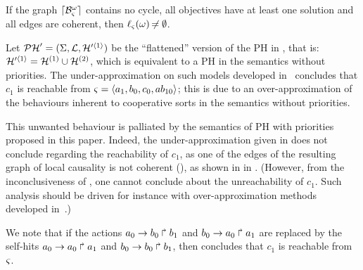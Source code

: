 \begin{theorem}
\label{th:approxinf}
  If the graph $\lceil \mathcal{B}_\varsigma^\omega\rceil$ contains no cycle,
  all objectives have at least one solution
  and all edges are coherent,
  then $\ell_\varsigma(\omega) \not\nobreak\mkern -2mu = \emptyset$.
\end{theorem}




\begin{example}
  Let $\mathcal{PH}' = (\Sigma, \mathcal{L}, \mathcal{H}'^{\langle 1 \rangle})$ be the “flattened” version of the PH in , that is: $\mathcal{H}'^{\langle 1 \rangle} = \mathcal{H}^{(1)} \cup \mathcal{H}^{(2)}$,
  which is equivalent to a PH in the semantics without priorities.
  The under-approximation on such models developed in~\cite{PMR12-MSCS} concludes that $c_1$ is reachable from $\varsigma = \mbox{$\langle a_1, b_0, c_0, ab_{10} \rangle$}$;
  this is due to an over-approximation of the behaviours inherent to cooperative sorts in the semantics without priorities.
  
  This unwanted behaviour is palliated by the semantics of PH with priorities proposed in this paper.
  Indeed, the under-approximation given in  does not conclude regarding the reachability of $c_1$,
  as one of the edges of the resulting graph of local causality is not coherent (),
  as shown in in .
  (However, from the inconclusiveness of , one cannot conclude about the unreachability of $c_1$.
  Such analysis should be driven for instance with over-approximation methods developed in~\cite{PMR10-TCSB}.)
  
  We note that if the actions $a_0\rightarrow b_0\Rsh b_1$ and $b_0\rightarrow a_0\Rsh a_1$ are replaced by the self-hits
  $a_0\rightarrow a_0\Rsh a_1$ and $b_0\rightarrow b_0\Rsh b_1$,
  then  concludes that $c_1$ is reachable from $\varsigma$.
\end{example}

